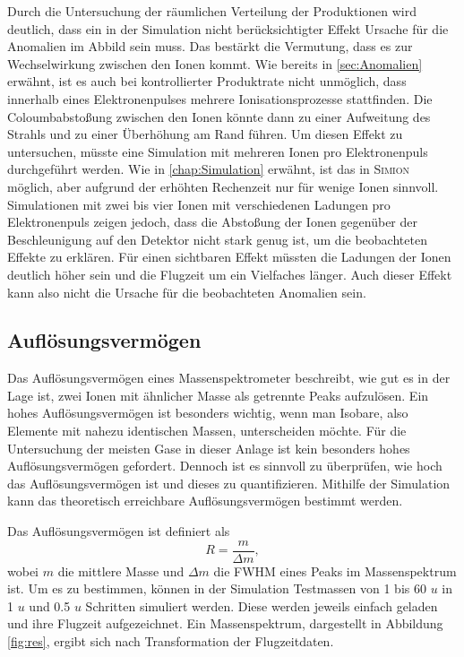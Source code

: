 Durch die Untersuchung der räumlichen Verteilung der Produktionen wird deutlich, dass ein in der Simulation nicht berücksichtigter Effekt Ursache für die Anomalien im Abbild sein muss. Das bestärkt die Vermutung, dass es zur Wechselwirkung zwischen den Ionen kommt. Wie bereits in \ref{sec:Anomalien} erwähnt, ist es auch bei kontrollierter Produktrate nicht unmöglich, dass innerhalb eines Elektronenpulses mehrere Ionisationsprozesse stattfinden. Die Coloumbabstoßung zwischen den Ionen könnte dann zu einer Aufweitung des Strahls und zu einer Überhöhung am Rand führen. Um diesen Effekt zu untersuchen, müsste eine Simulation mit mehreren Ionen pro Elektronenpuls durchgeführt werden. Wie in \ref{chap:Simulation} erwähnt, ist das in \textsc{Simion} möglich, aber aufgrund der erhöhten Rechenzeit nur für wenige Ionen sinnvoll. Simulationen mit zwei bis vier Ionen mit verschiedenen Ladungen pro Elektronenpuls zeigen jedoch, dass die Abstoßung der Ionen gegenüber der Beschleunigung auf den Detektor nicht stark genug ist, um die beobachteten Effekte zu erklären. Für einen sichtbaren Effekt müssten die Ladungen der Ionen deutlich höher sein und die Flugzeit um ein Vielfaches länger. Auch dieser Effekt kann also nicht die Ursache für die beobachteten Anomalien sein.

\label{sec:delay}
\subsection{Auflösungsvermögen}
Das Auflösungsvermögen eines Massenspektrometer beschreibt, wie gut es in der Lage ist, zwei Ionen mit ähnlicher Masse als getrennte Peaks aufzulösen. Ein hohes Auflösungsvermögen ist besonders wichtig, wenn man Isobare, also Elemente mit nahezu identischen Massen, unterscheiden möchte. Für die Untersuchung der meisten Gase in dieser Anlage ist kein besonders hohes Auflösungsvermögen gefordert. Dennoch ist es sinnvoll zu überprüfen, wie hoch das Auflösungsvermögen ist und dieses zu quantifizieren. Mithilfe der Simulation kann das theoretisch erreichbare Auflösungsvermögen bestimmt werden. 

Das Auflösungsvermögen ist definiert als 
\begin{equation}
    R = \frac{m}{\Delta m},
    \label{eq:res}
\end{equation}
wobei $m$ die mittlere Masse und $\Delta m$ die FWHM eines Peaks im Massenspektrum ist. Um es zu bestimmen, können in der Simulation Testmassen von 1 bis 60 $u$ in 1 $u$ und 0.5 $u$ Schritten simuliert werden. Diese werden jeweils einfach geladen und ihre Flugzeit aufgezeichnet. Ein Massenspektrum, dargestellt in Abbildung \ref{fig:res}, ergibt sich nach Transformation der Flugzeitdaten.

